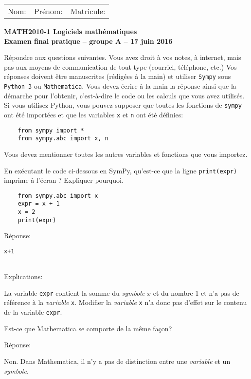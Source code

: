 




{\bfseries\sffamily
\begin{tabular}{p{5cm}p{6cm}r}
    Nom: & Prénom: & Matricule:
\end{tabular}}
\medskip

\begin{center}
  \normalfont\sffamily\large\bfseries\color{black}
    MATH2010-1 Logiciels mathématiques\\
    Examen final pratique -- groupe A -- 17 juin 2016
\end{center}

Répondre aux questions suivantes. 
Vous avez droit à vos notes, à internet, mais pas aux moyens de communication
de tout type (courriel, téléphone, etc.)
Vos réponses doivent être manuscrites
(rédigées à la main) et utiliser \texttt{Sympy} sous \texttt{Python 3} ou
\texttt{Mathematica}.
Vous devez écrire à la main la réponse ainsi que la démarche pour l'obtenir,
c'est-à-dire le code ou les calculs que vous avez utilisés.
Si vous utilisez Python, vous pouvez supposer que toutes les fonctions de
\verb|sympy| ont été importées et que les variables \verb|x| et \verb|n| ont
été définies:
\begin{verbatim}
    from sympy import *
    from sympy.abc import x, n
\end{verbatim}
Vous devez mentionner toutes les autres variables et fonctions que vous
importez.

\begin{question}[2 pts]
En exécutant le code ci-dessous en SymPy, qu'est-ce que la ligne
\texttt{print(expr)} imprime à l'écran ? Expliquer pourquoi.
\begin{verbatim}
    from sympy.abc import x
    expr = x + 1
    x = 2
    print(expr)
\end{verbatim}
\begin{mybox}
    Réponse:
    \begin{reponse}
	\verb|x+1|
    \end{reponse}\\[5pt]
    Explications:
    \begin{reponse}
	La variable \verb|expr| contient la somme du \emph{symbole} $x$
	et du nombre 1 et n'a pas de référence à la \emph{variable} \verb|x|.
	Modifier la \emph{variable} \verb|x| n'a donc pas d'effet sur le
	contenu de la variable \verb|expr|.
    \end{reponse}
\end{mybox}
Est-ce que Mathematica se comporte de la même façon?
\begin{mybox}
    Réponse:\\[10pt]
    \begin{reponse}
	Non. Dans Mathematica, il n'y a pas de distinction entre
	une \emph{variable} et un \emph{symbole}.
    \end{reponse}
\end{mybox}
\end{question}

